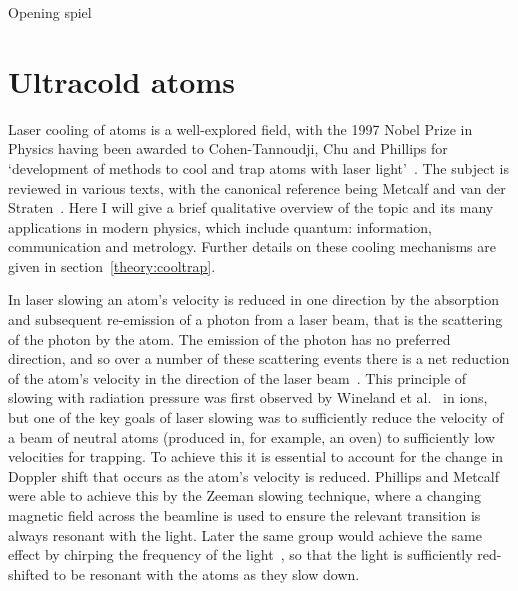 
Opening spiel
\cite{Andre2006}

\section{Ultracold atoms}


Laser cooling of atoms is a well-explored field, with the 1997 Nobel Prize in
Physics having been awarded to Cohen-Tannoudji, Chu and Phillips for
`development of methods to cool and trap atoms with laser
light'~\cite{RevModPhys.70.721}. The subject is reviewed in various texts, with
the canonical reference being Metcalf and van der Straten~\cite{Metcalf1999}.
Here I will give a brief qualitative overview of the topic and its many
applications in modern physics, which include quantum: information,
communication and metrology. Further details on these cooling mechanisms are
given in section~\ref{theory:cooltrap}.

In laser slowing an atom's velocity is reduced in one direction by the absorption and
subsequent re-emission of a photon from a laser beam, that is the scattering of
the photon by the atom. The emission of the
photon has no preferred direction, and so over a number of these scattering events there
is a net reduction of the atom's velocity in the direction of the laser
beam~\cite{PhysRevLett.40.1639}. This principle of slowing with radiation
pressure was first observed by Wineland et al.~\cite{PhysRevLett.40.1639} in
ions, but one of the key goals of laser slowing was to sufficiently reduce the
velocity of a beam of neutral atoms (produced in, for example, an oven) to
sufficiently low velocities for trapping. To achieve this it is essential to
account for the change in Doppler shift that occurs as the atom's velocity is
reduced. Phillips and Metcalf~\cite{PhysRevLett.48.596} were able to achieve this by
the Zeeman slowing technique, where a changing magnetic field across the
beamline is used to ensure the relevant transition is always resonant with the
light. Later the same group would achieve the same effect by chirping the
frequency of the light~\cite{Prodan1984}, so that the light is sufficiently
red-shifted to be resonant with the atoms as they slow down.

